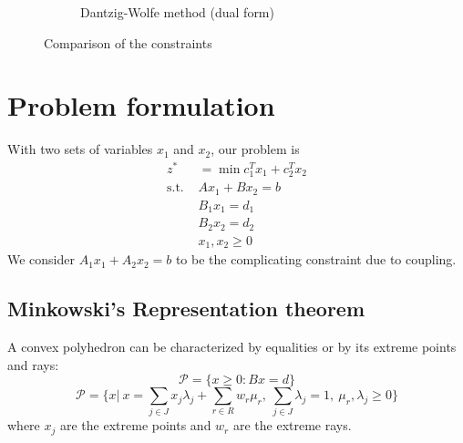 \documentclass[12pt, openany]{report}
\theoremstyle{definition}
\begin{document}
\begin{figure}[H]
\begin{subfigure}[b]{.5\textwidth}
		\caption{Dantzig-Wolfe method (dual form)}
	\end{subfigure}
	\caption{Comparison of the constraints}
	\label{fig:dw}
\end{figure}
\section{Problem formulation}
With two sets of variables $x_1$ and $x_2$, our problem is 
\begin{equation}
	\begin{aligned}
		z^* &= \min c_1^Tx_1 + c_2^Tx_2\\
		\text{s.t. } &Ax_1 + Bx_2 = b\\
		&B_1x_1 = d_1\\
		&B_2x_2 = d_2\\
		&x_1,x_2\ge 0
	\end{aligned}
\end{equation}
We consider $A_1x_1+A_2x_2=b$ to be the complicating constraint due to coupling. 
\subsection{Minkowski's Representation theorem}
A convex polyhedron can be characterized by equalities or by its extreme points and rays:
\begin{equation}
	\mathcal{P} = \{x\ge 0:Bx=d\} 
\end{equation}
\begin{equation}
	\mathcal{P} = \{x|\ x = \sum_{j\in J}x_j\lambda_j + \sum_{r\in R}w_r\mu_r, \ \sum_{j\in J} \lambda_j = 1, \ \mu_r,\lambda_j\ge 0\}
\end{equation}
where $x_j$ are the extreme points and $w_r$ are the extreme rays.\\
\end{document}
